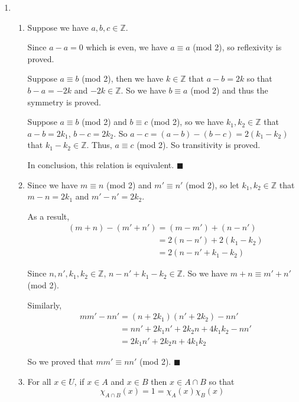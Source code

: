 \documentclass[11pt]{article}
\begin{document}
	\begin{enumerate}
		\item 
		\begin{enumerate}
			\item Suppose we have $a, b, c \in \mathbb{Z}$.
			
			Since $a - a = 0$ which is even, we have $a \equiv a$ (mod 2), so reflexivity is proved.
			
			Suppose $a \equiv b$ (mod 2), then we have $k \in \mathbb{Z}$ that $a - b = 2k$ so that $b - a = -2k$ and $-2k \in \mathbb{Z}$. So we have $b \equiv a$ (mod 2) and thus the symmetry is proved.
			
			Suppose $a \equiv b$ (mod 2) and  $b \equiv c$ (mod 2), so we have $k_1, k_2 \in \mathbb{Z}$ that $a - b = 2k_1$, $b - c = 2k_2$. So $a - c = (a - b) - (b - c) = 2(k_1 - k_2)$ that $k_1 - k_2 \in \mathbb{Z}$. Thus, $a \equiv c$ (mod 2). So transitivity is proved.
			
			In conclusion, this relation is equivalent.
			$\blacksquare$
			
			\item Since we have $m \equiv n$ (mod 2) and $m' \equiv n'$ (mod 2), so let $k_1, k_2 \in \mathbb{Z}$ that $m - n = 2k_1$ and $m' - n' = 2k_2$.
			
			As a result, 
			\begin{align}
				&(m + n) - (m' + n') = (m - m') + (n - n')\nonumber\\ 
				&\phantom{(m + n) - (m' + n')} = 2(n - n') + 2(k_1 - k_2)\nonumber\\
				&\phantom{(m + n) - (m' + n')} = 2(n - n' + k_1 - k_2)\nonumber
			\end{align}
			
			Since $n, n', k_1, k_2 \in \mathbb{Z}$, $n - n' + k_1 - k_2 \in \mathbb{Z}$. So we have $m + n \equiv m' + n'$ (mod 2).
			
			Similarly, 
			\begin{align}
				&mm' - nn' = (n + 2k_1)(n' + 2k_2) - nn'\nonumber\\
				&\phantom{mm' - nn'} = nn' + 2k_1n' + 2k_2n + 4k_1k_2 - nn'\nonumber\\
				&\phantom{mm' - nn'} = 2k_1n' + 2k_2n + 4k_1k_2\nonumber
			\end{align}
			
			So we proved that $mm' \equiv nn'$ (mod 2).
			$\blacksquare$
			\item For all $x \in U$, if $x \in A$ and $x \in B$ then $x \in A \cap B$ so that
			\[\chi_{A \cap B}(x) = 1 = \chi_{A}(x)\chi_{B}(x)\]
			

\end{enumerate}
\end{enumerate}
\end{document}
